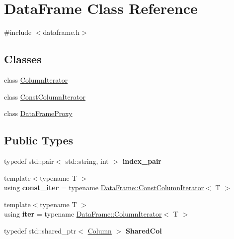 \hypertarget{classDataFrame}{}\section{Data\+Frame Class Reference}
\label{classDataFrame}


{\ttfamily \#include $<$dataframe.\+h$>$}

\subsection*{Classes}
\begin{DoxyCompactItemize}
\item 
class \hyperlink{classDataFrame_1_1ColumnIterator}{Column\+Iterator}
\item 
class \hyperlink{classDataFrame_1_1ConstColumnIterator}{Const\+Column\+Iterator}
\item 
class \hyperlink{classDataFrame_1_1DataFrameProxy}{Data\+Frame\+Proxy}
\end{DoxyCompactItemize}
\subsection*{Public Types}
\begin{DoxyCompactItemize}
\item 
\mbox{\label{classDataFrame_ad93eb4d37be97ccfb877d55492e7c466}} 
typedef std\+::pair$<$ std\+::string, int $>$ {\bfseries index\+\_\+pair}
\item 
\mbox{\label{classDataFrame_ac671e117f490645e57260a411588259b}} 
{\footnotesize template$<$typename T $>$ }\\using {\bfseries const\+\_\+iter} = typename \hyperlink{classDataFrame_1_1ConstColumnIterator}{Data\+Frame\+::\+Const\+Column\+Iterator}$<$ T $>$
\item 
\mbox{\label{classDataFrame_ae7adc59ee324161ae3717b1d27ea52f5}} 
{\footnotesize template$<$typename T $>$ }\\using {\bfseries iter} = typename \hyperlink{classDataFrame_1_1ColumnIterator}{Data\+Frame\+::\+Column\+Iterator}$<$ T $>$
\item 
\mbox{\label{classDataFrame_ab4b83782ba7a3ce010fae4f73480c26f}} 
typedef std\+::shared\+\_\+ptr$<$ \hyperlink{classColumn}{Column} $>$ {\bfseries Shared\+Col}
\end{DoxyCompactItemize}
